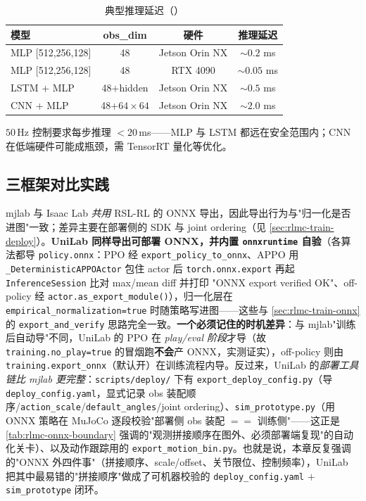 \begin{table}[H]
\centering
\caption{典型推理延迟（）}
\label{tab:rlmc-onnx-latency}
\begin{tabular}{lccc}
\hline
模型 & obs\_dim & 硬件 & 推理延迟 \\
\hline
MLP [512,256,128] & 48 & Jetson Orin NX & $\sim0.2$ ms \\
MLP [512,256,128] & 48 & RTX 4090 & $\sim0.05$ ms \\
LSTM + MLP & 48+hidden & Jetson Orin NX & $\sim0.5$ ms \\
CNN + MLP & 48+$64{\times}64$ & Jetson Orin NX & $\sim2.0$ ms \\
\hline
\end{tabular}
\end{table}

$50\,$Hz 控制要求每步推理 $<20\,$ms——MLP 与 LSTM 都远在安全范围内；CNN 在低端硬件可能成瓶颈，需 TensorRT 量化等优化。

\subsection{三框架对比实践}

mjlab 与 Isaac Lab \emph{共用} RSL-RL 的 ONNX 导出，因此导出行为与"归一化是否进图"一致；差异主要在部署侧的 SDK 与 joint ordering（见 \cref{sec:rlmc-train-deploy}）。\textbf{UniLab 同样导出可部署 ONNX，并内置 \texttt{onnxruntime} 自验}（各算法都导 \verb|policy.onnx|：PPO 经 \verb|export_policy_to_onnx|、APPO 用 \verb|_DeterministicAPPOActor| 包住 actor 后 \verb|torch.onnx.export| 再起 \verb|InferenceSession| 比对 max/mean diff 并打印 "ONNX export verified OK"、off-policy 经 \verb|actor.as_export_module()|），归一化层在 \verb|empirical_normalization=true| 时随策略写进图——这些与 \cref{sec:rlmc-train-onnx} 的 \verb|export_and_verify| 思路完全一致。\textbf{一个必须记住的时机差异}：与 mjlab"训练后自动导"不同，UniLab 的 PPO 在 \emph{play/eval 阶段}才导（故 \verb|training.no_play=true| 的冒烟跑\textbf{不会}产 ONNX，实测证实），off-policy 则由 \verb|training.export_onnx|（默认开）在训练流程内导。反过来，UniLab 的\emph{部署工具链比 mjlab 更完整}：\verb|scripts/deploy/| 下有 \verb|export_deploy_config.py|（导 \verb|deploy_config.yaml|，显式记录 obs 装配顺序/\verb|action_scale|/\verb|default_angles|/joint ordering）、\verb|sim_prototype.py|（用 ONNX 策略在 MuJoCo 逐段校验"部署侧 obs 装配 $==$ 训练侧"——这正是 \cref{tab:rlmc-onnx-boundary} 强调的"观测拼接顺序在图外、必须部署端复现"的自动化关卡）、以及动作跟踪用的 \verb|export_motion_bin.py|。也就是说，本章反复强调的"ONNX 外四件事"（拼接顺序、scale/offset、关节限位、控制频率），UniLab 把其中最易错的"拼接顺序"做成了可机器校验的 \verb|deploy_config.yaml| $+$ \verb|sim_prototype| 闭环。


